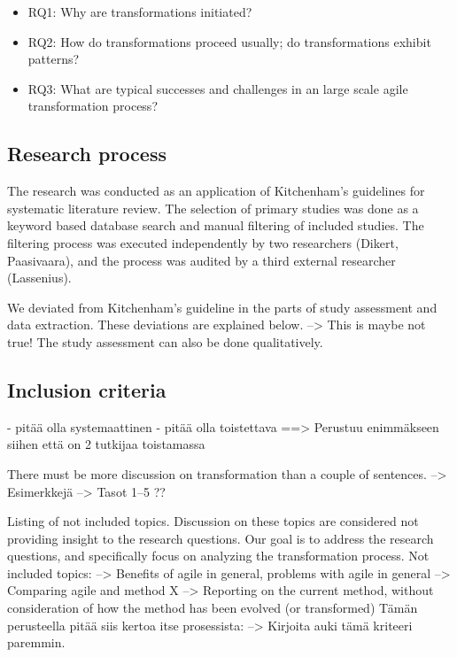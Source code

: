 \documentclass[preprint,authoryear,12pt]{elsarticle}
\begin{document}
\begin{itemize}

\item
RQ1: Why are transformations initiated?

\item
RQ2: How do transformations proceed usually; do transformations exhibit patterns?

\item
RQ3: What are typical successes and challenges in an large scale agile
    transformation process?

\end{itemize}

\subsection{Research process}

The research was conducted as an application of Kitchenham's
\cite{Kitchenham2007} guidelines for systematic literature review. The selection
of primary studies was done as a keyword based database search and manual
filtering of included studies. The filtering process was executed independently
by two researchers (Dikert, Paasivaara), and the process was audited by a third
external researcher (Lassenius).

We deviated from Kitchenham's guideline in the parts of study assessment and
data extraction. These deviations are explained below.
--> This is maybe not true! The study assessment can also be done qualitatively.


\subsection{Inclusion criteria}
- pitää olla systemaattinen
- pitää olla toistettava
==> Perustuu enimmäkseen siihen että on 2 tutkijaa toistamassa


There must be more discussion on transformation than a couple of sentences.
--> Esimerkkejä
--> Tasot 1--5 ??

Listing of not included topics. Discussion on these topics are considered not
providing insight to the research questions. Our goal is to address the research
questions, and specifically focus on analyzing the transformation process.
Not included topics:
--> Benefits of agile in general, problems with agile in general
--> Comparing agile and method X
--> Reporting on the current method, without consideration of how the method has
    been evolved (or transformed)
Tämän perusteella pitää siis kertoa itse prosessista: --> Kirjoita auki tämä
kriteeri paremmin.
\end{document}

